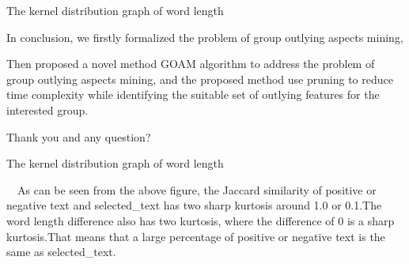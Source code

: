 \documentclass[
 size=14pt,
 paper=smartboard,  %
 mode=present, 		%
 display=slides, 	%
 style=tuliplab,  	%
 pauseslide,
 fleqn,leqno]{powerdot}
\begin{document}
\begin{slide}[toc=,bm=]{The kernel distribution graph of word length}
\begin{note}
In conclusion,
we firstly formalized the problem of
group outlying aspects mining,

Then proposed a novel method GOAM algorithm to address the problem of
group outlying aspects mining,
and the proposed method use pruning to reduce time complexity
while identifying the suitable set of outlying features for the interested group.

Thank you and any question?
\end{note}

\end{slide}

\begin{slide}{The kernel distribution graph of word length}

  \centering
  ~\
  As can be seen from the above figure, the Jaccard similarity of 
  positive or negative text and selected_text has two sharp kurtosis 
  around 1.0 or 0.1.The word length difference also has two kurtosis,
   where the difference of 0 is a sharp kurtosis.That means that a large 
   percentage of positive or negative text is the same as selected_text.
  

\end{slide}






\end{document}
